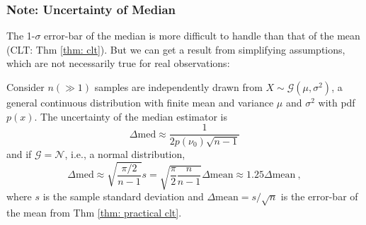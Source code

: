 \subsubsection*{Note: Uncertainty of Median}
The 1-$ \sigma $ error-bar of the median is more difficult to handle than that of the mean (CLT: Thm \ref{thm: clt}). But we can get a result from simplifying assumptions, which are not necessarily true for real observations:

\begin{thm}
  Consider $ n (\gg 1) $ samples are independently drawn from $ X \sim \mathcal{G}(\mu, \sigma^2) $, a general continuous distribution with finite mean and variance $ \mu $ and $ \sigma^2 $ with pdf $ p(x) $. The uncertainty of the median estimator is 
  \begin{equation}\label{eq: err median general}
    \Delta \mathrm{med} \approx \frac{1}{2 p(\nu_0) \sqrt{n - 1}}
  \end{equation}
  and if $ \mathcal{G} =  \mathcal{N} $, i.e., a normal distribution,
  \begin{equation}\label{eq: err median}
    \Delta \mathrm{med} 
      \approx \sqrt{\frac{\pi / 2}{n - 1}} s 
      = \sqrt{\frac{\pi}{2} \frac{n}{n - 1}} \Delta \mathrm{mean}
      \approx 1.25 \Delta \mathrm{mean}
       ~,
  \end{equation}
  where $ s $ is the sample standard deviation and $ \Delta \mathrm{mean} = s / \sqrt{n} $ is the error-bar of the mean from Thm \ref{thm: practical clt}.
\end{thm}
